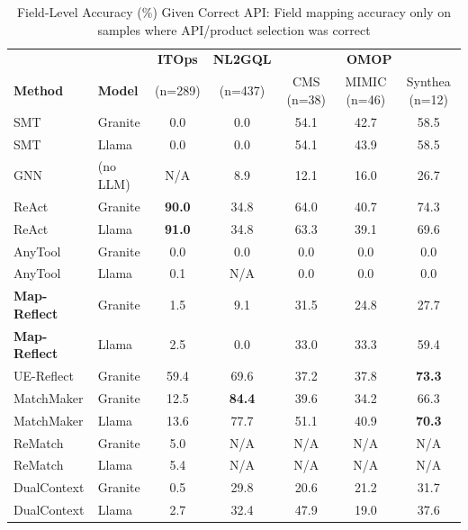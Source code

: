 \documentclass[sigconf, nonacm]{acmart}
\begin{document}
  \begin{table}[htbp]
  \centering
  \caption{Field-Level Accuracy (\%) Given Correct API: Field mapping accuracy only on samples where API/product selection was correct}
  \label{tab:field_accuracy}
  \begin{tabular}{ll|c|c|ccc}
  \toprule
  & & \textbf{ITOps} & \textbf{NL2GQL} & \multicolumn{3}{c}{\textbf{OMOP}} \\
  \textbf{Method} & \textbf{Model} & (n=289) & (n=437) & CMS (n=38) & MIMIC (n=46) & Synthea (n=12) \\
  \midrule
  SMT & Granite & 0.0 & 0.0 & 54.1 & 42.7 & 58.5 \\
  SMT & Llama & 0.0 & 0.0 & 54.1 & 43.9 & 58.5 \\
  \midrule
  GNN & (no LLM) & N/A & 8.9 & 12.1 & 16.0 & 26.7 \\
  \midrule
  ReAct & Granite & \textbf{90.0} & 34.8 & 64.0 & 40.7 & 74.3 \\
  ReAct & Llama & \textbf{91.0} & 34.8 & 63.3 & 39.1 & 69.6 \\
  \midrule
  AnyTool & Granite & 0.0 & 0.0 & 0.0 & 0.0 & 0.0 \\
  AnyTool & Llama & 0.1 & N/A & 0.0 & 0.0 & 0.0 \\
  \midrule
  \textbf{Map-Reflect} & Granite & 1.5 & 9.1 & 31.5 & 24.8 & 27.7 \\
  \textbf{Map-Reflect} & Llama & 2.5 & 0.0 & 33.0 & 33.3 & 59.4 \\
  \midrule
  UE-Reflect & Granite & 59.4 & 69.6 & 37.2 & 37.8 & \textbf{73.3} \\
  \midrule
  MatchMaker & Granite & 12.5 & \textbf{84.4} & 39.6 & 34.2 & 66.3 \\
  MatchMaker & Llama & 13.6 & 77.7 & 51.1 & 40.9 & \textbf{70.3} \\
  \midrule
  ReMatch & Granite & 5.0 & N/A & N/A & N/A & N/A \\
  ReMatch & Llama & 5.4 & N/A & N/A & N/A & N/A \\
  \midrule
  DualContext & Granite & 0.5 & 29.8 & 20.6 & 21.2 & 31.7 \\
  DualContext & Llama & 2.7 & 32.4 & 47.9 & 19.0 & 37.6 \\
  \bottomrule
  \end{tabular}
  \end{table}
\end{document}
